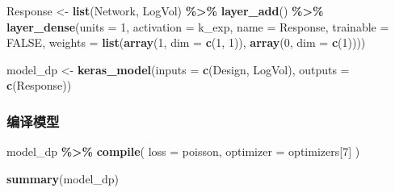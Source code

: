 \documentclass[
]{article}
\newenvironment{Shaded}{\begin{snugshade}}{\end{snugshade}}
\newcommand{\AttributeTok}[1]{\textcolor[rgb]{0.13,0.29,0.53}{#1}}
\newcommand{\ConstantTok}[1]{\textcolor[rgb]{0.56,0.35,0.01}{#1}}
\newcommand{\DecValTok}[1]{\textcolor[rgb]{0.00,0.00,0.81}{#1}}
\newcommand{\FunctionTok}[1]{\textcolor[rgb]{0.13,0.29,0.53}{\textbf{#1}}}
\newcommand{\NormalTok}[1]{#1}
\newcommand{\OtherTok}[1]{\textcolor[rgb]{0.56,0.35,0.01}{#1}}
\newcommand{\SpecialCharTok}[1]{\textcolor[rgb]{0.81,0.36,0.00}{\textbf{#1}}}
\newcommand{\StringTok}[1]{\textcolor[rgb]{0.31,0.60,0.02}{#1}}
\begin{document}
\begin{Shaded}
\begin{Highlighting}[]
\NormalTok{Response }\OtherTok{\textless{}{-}} \FunctionTok{list}\NormalTok{(Network, LogVol) }\SpecialCharTok{\%\textgreater{}\%}
  \FunctionTok{layer\_add}\NormalTok{() }\SpecialCharTok{\%\textgreater{}\%} 
  \FunctionTok{layer\_dense}\NormalTok{(}\AttributeTok{units =} \DecValTok{1}\NormalTok{, }\AttributeTok{activation =}\NormalTok{ k\_exp, }\AttributeTok{name =} \StringTok{\textquotesingle{}Response\textquotesingle{}}\NormalTok{, }\AttributeTok{trainable =} \ConstantTok{FALSE}\NormalTok{,}
              \AttributeTok{weights =} \FunctionTok{list}\NormalTok{(}\FunctionTok{array}\NormalTok{(}\DecValTok{1}\NormalTok{, }\AttributeTok{dim =} \FunctionTok{c}\NormalTok{(}\DecValTok{1}\NormalTok{, }\DecValTok{1}\NormalTok{)), }\FunctionTok{array}\NormalTok{(}\DecValTok{0}\NormalTok{, }\AttributeTok{dim =} \FunctionTok{c}\NormalTok{(}\DecValTok{1}\NormalTok{))))}

\NormalTok{model\_dp }\OtherTok{\textless{}{-}} \FunctionTok{keras\_model}\NormalTok{(}\AttributeTok{inputs =} \FunctionTok{c}\NormalTok{(Design, LogVol), }\AttributeTok{outputs =} \FunctionTok{c}\NormalTok{(Response))}
\end{Highlighting}
\end{Shaded}

\subsubsection{编译模型}\label{ux7f16ux8bd1ux6a21ux578b-1}

\begin{Shaded}
\begin{Highlighting}[]
\NormalTok{model\_dp }\SpecialCharTok{\%\textgreater{}\%} \FunctionTok{compile}\NormalTok{(}
  \AttributeTok{loss =} \StringTok{\textquotesingle{}poisson\textquotesingle{}}\NormalTok{,}
  \AttributeTok{optimizer =}\NormalTok{ optimizers[}\DecValTok{7}\NormalTok{]}
\NormalTok{)}

\FunctionTok{summary}\NormalTok{(model\_dp)}
\end{Highlighting}
\end{Shaded}
\end{document}
